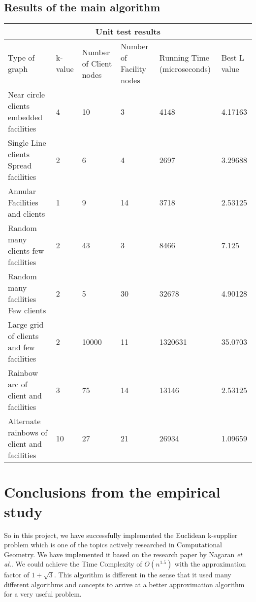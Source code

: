 \documentclass[12pt, a4paper]{article}
\newcommand{\etal}{\textit{et al.}}
\begin{document}
{\subsection{Results of the main algorithm}
\begin{longtable}{ |p{2cm}|p{2cm}|p{2cm}|p{2cm}|p{2cm}| p{2cm}|  }
 \hline
 \multicolumn{6}{|c|}{Unit test results} \\
 \hline
Type of graph & k- value & Number of Client nodes &Number of Facility nodes & Running Time (microseconds) & Best L value\\
 \hline
Near circle clients embedded facilities   & 4   &10& 3&4148&4.17163  \\\hline
Single Line clients Spread facilities   & 2   &6& 4&2697&3.29688  \\\hline
Annular Facilities and clients  & 1   &9& 14&3718&2.53125  \\\hline
Random many clients few facilities   & 2   &43& 3&8466&7.125  \\\hline
Random many facilities Few clients  & 2   &5& 30&32678&4.90128  \\\hline
Large grid of clients and few facilities &2&10000&11&1320631&35.0703 \\\hline
Rainbow arc of client and facilities   & 3  &75& 14&13146&2.53125  \\\hline
Alternate rainbows of client and facilities&10 &27 &21&26934&1.09659  \\\hline

 \hline
\end{longtable}


\section{Conclusions from the empirical study}
So in this project, we have successfully implemented the Euclidean k-supplier problem which is one of the topics actively researched in Computational Geometry. We have implemented it based on the research paper by Nagaran \etal. We could achieve the Time Complexity of $O(n^{1.5})$ with the approximation factor of $1+\sqrt{3}$. This algorithm is different in the sense that it used many different algorithms and concepts to arrive at a better approximation algorithm for a very useful problem.\\

}
\end{document}
